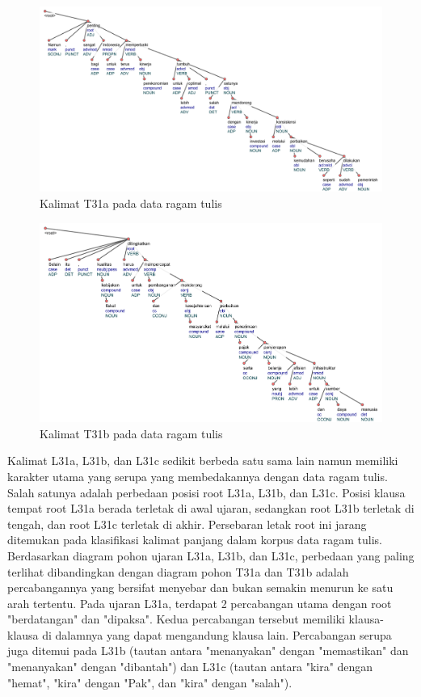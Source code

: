 \begin{figure}
	\centering \includegraphics[width=1
	\textwidth] {pics/ts2079.jpg} 
	\caption{Kalimat T31a pada data ragam tulis} 
	\label{fig:ts2079} 
\end{figure}

\begin{figure}
	\centering \includegraphics[width=1
	\textwidth] {pics/ts2081.jpg} 
	\caption{Kalimat T31b pada data ragam tulis} 
	\label{fig:ts2081} 
\end{figure}

Kalimat L31a, L31b, dan L31c sedikit berbeda satu sama lain namun memiliki karakter utama yang serupa yang membedakannya dengan data ragam tulis. Salah satunya adalah perbedaan posisi root L31a, L31b, dan L31c. Posisi klausa tempat root L31a berada  terletak di awal ujaran, sedangkan root L31b terletak di tengah, dan root L31c terletak di akhir. Persebaran letak root ini jarang ditemukan pada klasifikasi kalimat panjang dalam korpus data ragam tulis. Berdasarkan diagram pohon ujaran L31a, L31b, dan L31c, perbedaan yang paling terlihat dibandingkan dengan diagram pohon T31a dan T31b adalah percabangannya yang bersifat menyebar dan bukan semakin menurun ke satu arah tertentu. Pada ujaran L31a, terdapat 2 percabangan utama dengan root "berdatangan" dan "dipaksa". Kedua percabangan tersebut memiliki klausa-klausa di dalamnya yang dapat mengandung klausa lain. Percabangan serupa juga ditemui pada L31b (tautan antara "menanyakan" dengan "memastikan" dan "menanyakan" dengan "dibantah") dan L31c (tautan antara "kira" dengan "hemat", "kira" dengan "Pak", dan "kira" dengan "salah"). 

